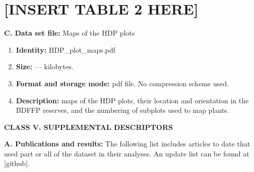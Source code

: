 \documentclass[
  english,
  man]{apa6}
\begin{document}
\hypertarget{insert-table-2-here}{%
\section{{[}INSERT TABLE 2 HERE{]}}\label{insert-table-2-here}}

\noindent  
\textbf{C. Data set file:} Maps of the HDP plots

\begin{enumerate}
\def\labelenumi{\arabic{enumi}.}
\item
  \textbf{Identity:} HDP\_plot\_maps.pdf
\item
  \textbf{Size:} --- kilobytes.
\item
  \textbf{Format and storage mode:} pdf file. No compression scheme used.
\item
  \textbf{Description:} maps of the HDP plots, their location and
  orientation in the BDFFP reserves, and the numbering of subplots
  used to map plants.
\end{enumerate}

\noindent  
\textbf{CLASS V. SUPPLEMENTAL DESCRIPTORS}

\noindent  
\textbf{A. Publications and results:} The following list includes
articles to date that used part or all of the dataset in their analyses.
An update list can be found at {[}github{]}.
\end{document}
